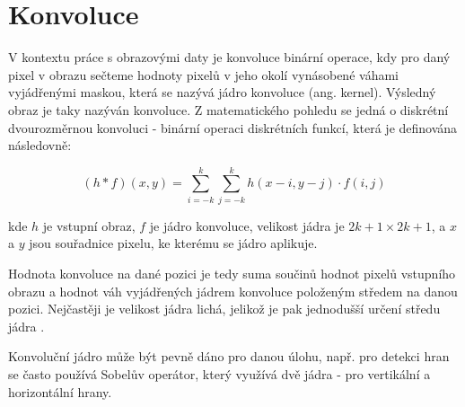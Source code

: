 
\section{Konvoluce}

V kontextu práce s obrazovými daty je konvoluce binární operace, kdy pro daný pixel
v obrazu sečteme hodnoty pixelů v jeho okolí vynásobené váhami vyjádřenými
maskou, která se nazývá jádro konvoluce (ang. kernel). Výsledný obraz je taky
nazýván konvoluce. Z matematického pohledu se jedná o diskrétní dvourozměrnou
konvoluci - binární operaci diskrétních funkcí, která je definována následovně:

\begin{equation*}
    (h*f)(x,y)=\sum _{i=-k}^{k}\sum _{j=-k}^{k}h(x-i,y-j)\cdot f(i,j)
\end{equation*}

kde $h$ je vstupní obraz, $f$ je jádro konvoluce, velikost jádra je $2k+1
    \times 2k+1$, a $x$ a $y$ jsou souřadnice pixelu, ke kterému se jádro aplikuje.

Hodnota konvoluce na dané pozici je tedy suma součinů hodnot pixelů vstupního
obrazu a hodnot váh vyjádřených jádrem konvoluce položeným středem na danou
pozici.
Nejčastěji je velikost jádra lichá,
jelikož je pak jednodušší určení středu jádra \cite{cnn_introduction}.



Konvoluční jádro může být pevně dáno pro danou úlohu, např. pro detekci hran se
často používá Sobelův operátor, který využívá dvě jádra - pro vertikální a
horizontální hrany. 

